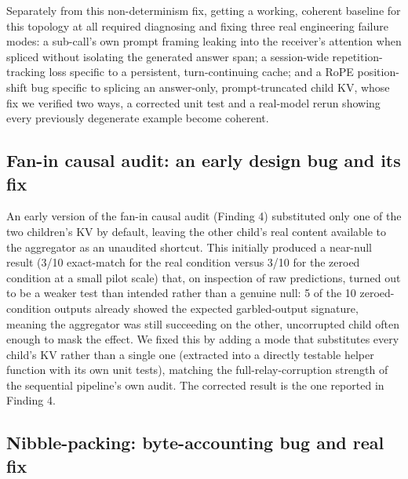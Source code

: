 \documentclass[11pt]{article}
\begin{document}
Separately from this non-determinism fix, getting a working, coherent
baseline for this topology at all required diagnosing and fixing three
real engineering failure modes: a sub-call's own prompt framing leaking
into the receiver's attention when spliced without isolating the
generated answer span; a session-wide repetition-tracking loss specific
to a persistent, turn-continuing cache; and a RoPE position-shift bug
specific to splicing an answer-only, prompt-truncated child KV, whose fix
we verified two ways, a corrected unit test and a real-model rerun
showing every previously degenerate example become coherent.

\subsection{Fan-in causal audit: an early design bug and its fix}
\label{app:faninbug}

An early version of the fan-in causal audit (Finding 4) substituted only
one of the two children's KV by default, leaving the other child's real
content available to the aggregator as an unaudited shortcut. This
initially produced a near-null result (3/10 exact-match for the real
condition versus 3/10 for the zeroed condition at a small pilot scale)
that, on inspection of raw predictions, turned out to be a weaker test
than intended rather than a genuine null: 5 of the 10 zeroed-condition
outputs already showed the expected garbled-output signature, meaning the
aggregator was still succeeding on the other, uncorrupted child often
enough to mask the effect. We fixed this by adding a mode that
substitutes every child's KV rather than a single one (extracted into a
directly testable helper function with its own unit tests), matching the
full-relay-corruption strength of the sequential pipeline's own audit.
The corrected result is the one reported in Finding 4.

\subsection{Nibble-packing: byte-accounting bug and real fix}
\label{app:nibble}
\end{document}
